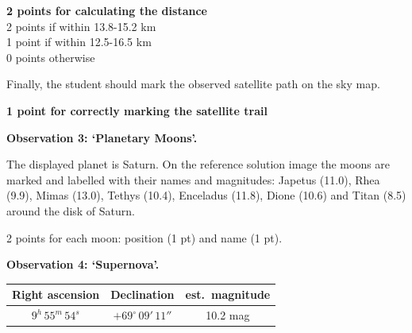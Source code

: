 \begin{flushright}
\textbf{2 points for calculating the distance}\\
2 points if within 13.8-15.2 km\\
1 point if within 12.5-16.5 km\\
0 points otherwise
\end{flushright}

Finally, the student should mark the observed satellite path on the sky map.

\begin{flushright}
\textbf{1 point for correctly marking the satellite trail}
\end{flushright}

\medskip
\textbf{Observation 3: `Planetary Moons'.}

The displayed planet is Saturn. On the reference solution image the moons
are marked and labelled with their names and magnitudes: Japetus (11.0),
Rhea (9.9), Mimas (13.0), Tethys (10.4), Enceladus (11.8), Dione (10.6) and
Titan (8.5) around the disk of Saturn.


2 points for each moon: position (1 pt) and name (1 pt).

\medskip
\textbf{Observation 4: `Supernova'.}

\begin{center}
\begin{tabular}{c|c|c}
Right ascension & Declination & est.\ magnitude \\
\hline
$9^h\,55^m\,54^s$ & $+69^\circ\,09'\,11''$ & 10.2 mag \\
\end{tabular}
\end{center}

